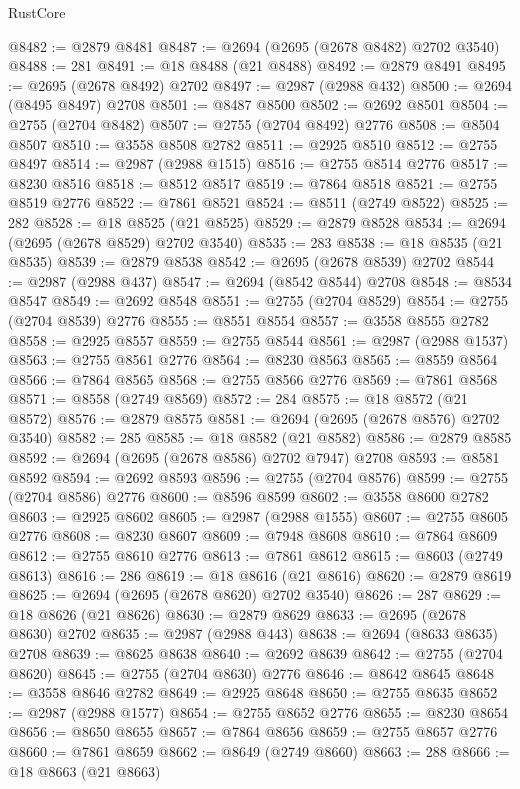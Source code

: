 \begin{lexlean}{RustCore}
\begin{coremodule}
@8482 := @2879 @8481
@8487 := @2694 (@2695 (@2678 @8482) @2702 @3540)
@8488 := 281
@8491 := @18 @8488 (@21 @8488)
@8492 := @2879 @8491
@8495 := @2695 (@2678 @8492) @2702
@8497 := @2987 (@2988 @432)
@8500 := @2694 (@8495 @8497) @2708
@8501 := @8487 @8500
@8502 := @2692 @8501
@8504 := @2755 (@2704 @8482)
@8507 := @2755 (@2704 @8492) @2776
@8508 := @8504 @8507
@8510 := @3558 @8508 @2782
@8511 := @2925 @8510
@8512 := @2755 @8497
@8514 := @2987 (@2988 @1515)
@8516 := @2755 @8514 @2776
@8517 := @8230 @8516
@8518 := @8512 @8517
@8519 := @7864 @8518
@8521 := @2755 @8519 @2776
@8522 := @7861 @8521
@8524 := @8511 (@2749 @8522)
@8525 := 282
@8528 := @18 @8525 (@21 @8525)
@8529 := @2879 @8528
@8534 := @2694 (@2695 (@2678 @8529) @2702 @3540)
@8535 := 283
@8538 := @18 @8535 (@21 @8535)
@8539 := @2879 @8538
@8542 := @2695 (@2678 @8539) @2702
@8544 := @2987 (@2988 @437)
@8547 := @2694 (@8542 @8544) @2708
@8548 := @8534 @8547
@8549 := @2692 @8548
@8551 := @2755 (@2704 @8529)
@8554 := @2755 (@2704 @8539) @2776
@8555 := @8551 @8554
@8557 := @3558 @8555 @2782
@8558 := @2925 @8557
@8559 := @2755 @8544
@8561 := @2987 (@2988 @1537)
@8563 := @2755 @8561 @2776
@8564 := @8230 @8563
@8565 := @8559 @8564
@8566 := @7864 @8565
@8568 := @2755 @8566 @2776
@8569 := @7861 @8568
@8571 := @8558 (@2749 @8569)
@8572 := 284
@8575 := @18 @8572 (@21 @8572)
@8576 := @2879 @8575
@8581 := @2694 (@2695 (@2678 @8576) @2702 @3540)
@8582 := 285
@8585 := @18 @8582 (@21 @8582)
@8586 := @2879 @8585
@8592 := @2694 (@2695 (@2678 @8586) @2702 @7947) @2708
@8593 := @8581 @8592
@8594 := @2692 @8593
@8596 := @2755 (@2704 @8576)
@8599 := @2755 (@2704 @8586) @2776
@8600 := @8596 @8599
@8602 := @3558 @8600 @2782
@8603 := @2925 @8602
@8605 := @2987 (@2988 @1555)
@8607 := @2755 @8605 @2776
@8608 := @8230 @8607
@8609 := @7948 @8608
@8610 := @7864 @8609
@8612 := @2755 @8610 @2776
@8613 := @7861 @8612
@8615 := @8603 (@2749 @8613)
@8616 := 286
@8619 := @18 @8616 (@21 @8616)
@8620 := @2879 @8619
@8625 := @2694 (@2695 (@2678 @8620) @2702 @3540)
@8626 := 287
@8629 := @18 @8626 (@21 @8626)
@8630 := @2879 @8629
@8633 := @2695 (@2678 @8630) @2702
@8635 := @2987 (@2988 @443)
@8638 := @2694 (@8633 @8635) @2708
@8639 := @8625 @8638
@8640 := @2692 @8639
@8642 := @2755 (@2704 @8620)
@8645 := @2755 (@2704 @8630) @2776
@8646 := @8642 @8645
@8648 := @3558 @8646 @2782
@8649 := @2925 @8648
@8650 := @2755 @8635
@8652 := @2987 (@2988 @1577)
@8654 := @2755 @8652 @2776
@8655 := @8230 @8654
@8656 := @8650 @8655
@8657 := @7864 @8656
@8659 := @2755 @8657 @2776
@8660 := @7861 @8659
@8662 := @8649 (@2749 @8660)
@8663 := 288
@8666 := @18 @8663 (@21 @8663)

\end{coremodule}
\end{lexlean}
